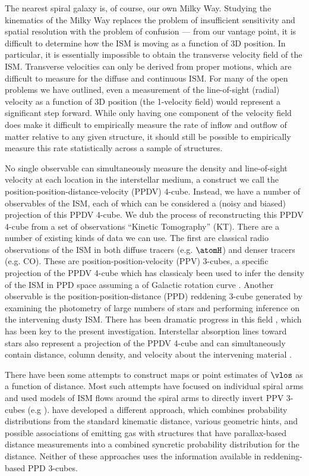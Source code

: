 The nearest spiral galaxy is, of course, our own Milky Way. 
Studying the kinematics of the Milky Way replaces the problem of insufficient sensitivity and spatial resolution with the problem of confusion --- from our vantage point, it is difficult to determine how the ISM is moving as a function of 3D position.
In particular, it is essentially impossible to obtain the transverse velocity field of the ISM. 
Transverse velocities can only be derived from proper motions, which are difficult to measure for the diffuse and continuous ISM.
For many of the open problems we have outlined, even a measurement of the line-of-sight (radial) velocity as a function of 3D position (the 1-velocity field) would represent a significant step forward. 
While only having one component of the velocity field does make it difficult to empirically measure the  rate of inflow and outflow of matter relative to any given structure, it should still be possible to empirically measure this rate statistically across a sample of structures. 

No single observable can simultaneously measure the density and line-of-sight velocity at each location in the interstellar medium, a construct we call the position-position-distance-velocity (PPDV) 4-cube. 
Instead, we have a number of observables of the ISM, each of which can be considered a (noisy and biased) projection of this PPDV 4-cube.
We dub the process of reconstructing this PPDV 4-cube from a set of observations ``Kinetic Tomography'' (KT). 
There are a number of existing kinds of data we can use. 
The first are classical radio observations of the ISM in both diffuse tracers (e.g. $\atomH$) and denser tracers (e.g. CO). 
These are position-position-velocity (PPV) 3-cubes, a specific projection of the PPDV 4-cube which has classicaly been used to infer the density of the ISM in PPD space assuming a of Galactic rotation curve \citep[e.g.][ and references therein]{Levine_2006}. 
Another observable is the position-position-distance (PPD) reddening 3-cube generated by examining the photometry of large numbers of stars and performing inference on the intervening dusty ISM. There has been dramatic progress in this field \citep{Marshall_2006,Lallement_2014,Green_2015}, which has been key to the present investigation. Interstellar absorption lines toward stars also represent a projection of the PPDV 4-cube and can simultaneously contain distance, column density, and velocity about the intervening material \citep{Welsh10,Zasowski_2014,2015MmSAI..86..521Z}.

There have been some attempts to construct maps or point estimates of $\vlos$ as a function of distance. 
Most such attempts have focused on individual spiral arms and used models of ISM flows around the spiral arms to directly invert PPV 3-cubes (e.g  \citealt{1972A&A....16..118S,Foster_2006}).
\citet{Reid_2016} have developed a different approach, which combines probability distributions from the standard kinematic distance, various geometric hints, and possible associations of emitting gas with structures that have parallax-based distance measurements into a combined syncretic probability distribution for the distance. 
Neither of these approaches uses the information available in reddening-based PPD 3-cubes. 

